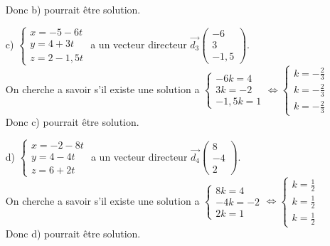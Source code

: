 \documentclass[a4paper, 12pt]{article}
\begin{document}
\begin{itemize}
    \\Donc b) pourrait être solution. \vspace{5mm}
    \item[c)] $\begin{cases} x = -5 - 6t \\ y = 4 + 3t \\ z = 2-1,5t \end{cases}$ a un vecteur directeur $\vec{d_3}\begin{pmatrix} -6 \\ 3 \\ -1,5 \end{pmatrix}$. 
    \\On cherche a savoir s'il existe une solution a $\begin{cases} -6k = 4 \\ 3k = -2 \\ -1,5k = 1 \end{cases} \iff \begin{cases} k = -\frac{2}{3} \\ k = -\frac{2}{3} \\k = -\frac{2}{3} \end{cases}$ 
    \\Donc c) pourrait être solution. \vspace{5mm}
    \item[d)] $\begin{cases} x = -2 - 8t \\ y = 4 - 4t \\ z = 6 + 2t \end{cases}$ a un vecteur directeur $\vec{d_4}\begin{pmatrix} 8 \\ -4 \\ 2 \end{pmatrix}$. 
    \\On cherche a savoir s'il existe une solution a $\begin{cases} 8k = 4 \\-4k = -2 \\ 2k = 1 \end{cases} \iff \begin{cases} k = \frac{1}{2} \\ k = \frac{1}{2} \\k = \frac{1}{2} \end{cases}$
    \\Donc d) pourrait être solution. \vspace{5mm}
\end{itemize}
\end{document}
